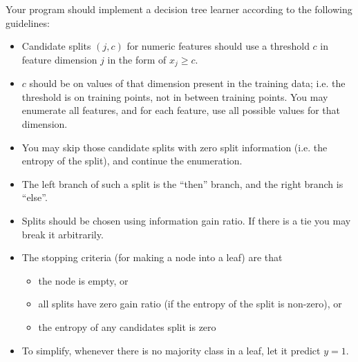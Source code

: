 \documentclass[a4paper]{article}
\theoremstyle{definition}
\begin{document}
Your program should implement a decision tree learner according to the following guidelines:
\begin{itemize}
\item Candidate splits $(j,c)$ for numeric features should use a threshold $c$ in feature dimension $j$ in the form of $x_{j}\ge c$.
\item $c$ should be on values of that dimension present in the training data; i.e. the threshold is on training points, not in between training points. You may enumerate all features, and for each feature, use all possible values for that dimension.
\item You may skip those candidate splits with zero split information (i.e. the entropy of the split), and continue the enumeration.
\item The left branch of such a split is the ``then'' branch, and the right branch is ``else''.
\item Splits should be chosen using information gain ratio. If there is a tie you may break it arbitrarily.
\item The stopping criteria (for making a node into a leaf) are that 
	\begin{itemize}
	\item the node is empty, or
	\item all splits have zero gain ratio (if the entropy of the split is non-zero), or
	\item the entropy of any candidates split is zero
	\end{itemize}
\item To simplify, whenever there is no majority class in a leaf, let it predict $y=1$.
\end{itemize}
\end{document}

